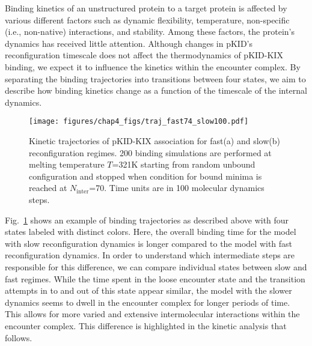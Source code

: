 \documentclass[../talant.diss.submit.tex]{subfiles}
\begin{document}
Binding kinetics of an unstructured protein to a target protein is affected by
various different factors such as dynamic flexibility, temperature, non-specific
(i.e., non-native) interactions, and stability.  Among these factors, the
protein's dynamics has received little attention.  Although changes
in pKID's reconfiguration timescale does not affect the thermodynamics of
pKID-KIX binding, we expect it to influence the kinetics within the encounter
complex.  By separating the binding trajectories into transitions between
four states, we aim to describe how binding kinetics change as a function of the
timescale of the internal dynamics.
%
\begin{figure}[htp!]
  \begin{centering}                                                                                        
    \texttt{[image: figures/chap4\_figs/traj\_fast74\_slow100.pdf]}
    \caption{Kinetic trajectories of pKID-KIX association for fast(a) and slow(b)
      reconfiguration regimes. 200 binding simulations are performed at melting
      temperature $T$=321K starting from random unbound configuration and stopped
      when condition for bound minima is reached at $N_{\mathrm{inter}}$=70.
      Time units are in 100 molecular dynamics steps.}
    \label{fig:traj_fast74_slow100}
  \end{centering}                                                                                          
\end{figure}                                                                                               
%

Fig.~\ref{fig:traj_fast74_slow100} shows an example of binding trajectories
as described above with four states labeled with distinct colors.
Here, the overall binding time for the model with slow reconfiguration dynamics is longer
compared to the model with fast reconfiguration dynamics. In order to understand which
intermediate steps are responsible for this difference, 
we can compare individual states between slow and fast regimes. While the
time spent in the loose encounter state and the transition attempts in to and
out of this state appear similar, the model with the slower
dynamics seems to dwell in the encounter complex for longer periods of time. This allows for more
varied and extensive intermolecular interactions within the encounter
complex. This difference is highlighted in the kinetic analysis that follows.
\end{document}
